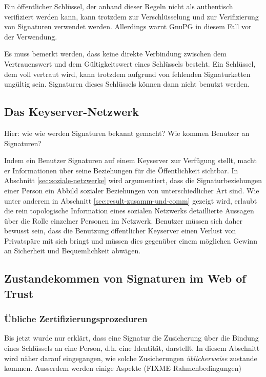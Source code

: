 Ein öffentlicher Schlüssel, der anhand dieser Regeln nicht als
authentisch verifiziert werden kann, kann trotzdem zur Verschlüsselung
und zur Verifizierung von Signaturen verwendet werden. Allerdings
warnt GnuPG in diesem Fall vor der Verwendung.

Es muss bemerkt werden, dass keine direkte Verbindung zwischen dem
Vertrauenswert und dem G\"ultigkeitswert eines Schl\"ussels
besteht. Ein Schl\"ussel, dem voll vertraut wird, kann trotzdem
aufgrund von fehlenden Signaturketten ung\"ultig sein. Signaturen
dieses Schl\"ussels k\"onnen dann nicht benutzt werden.

\subsection{Das Keyserver-Netzwerk}
\label{sec:das-keys-netzw}

Hier: wie wie werden Signaturen bekannt gemacht? Wie kommen Benutzer
an Signaturen?

Indem ein Benutzer Signaturen auf einem Keyserver zur Verf\"ugung
stellt, macht er Informationen \"uber seine Beziehungen f\"ur die
\"Offentlichkeit sichtbar. In Abschnitt \ref{sec:soziale-netzwerke}
wird argumentiert, dass die Signaturbeziehungen einer Person ein
Abbild sozialer Beziehungen von unterschiedlicher Art sind. Wie unter
anderem in Abschnitt \ref{sec:result-zusamm-und-comm} gezeigt wird,
erlaubt die rein topologische Information eines sozialen Netzwerks
detaillierte Aussagen \"uber die Rolle einzelner Personen im
Netzwerk\cite{Carrington2005}. Benutzer m\"ussen sich daher bewusst
sein, dass die Benutzung \"offentlicher Keyserver einen Verlust von
Privatsp\"are mit sich bringt und m\"ussen dies gegen\"uber einem
m\"oglichen Gewinn an Sicherheit und Bequemlichkeit abw\"agen.

\subsection{Zustandekommen von Signaturen im Web of Trust}
\label{sec:sozi-komp-des}

\subsubsection{\"Ubliche Zertifizierungsprozeduren}
\label{sec:ubliche-zert}

Bis jetzt wurde nur erkl\"art, dass eine Signatur die
Zusicherung \"uber die Bindung eines Schl\"ussels an eine Person,
d.h. eine Identit\"at, darstellt. In diesem Abschnitt wird n\"aher
darauf eingegangen, wie solche Zusicherungen \emph{\"ublicherweise}
zustande kommen. Ausserdem werden einige Aspekte (FIXME
Rahmenbedingungen)

